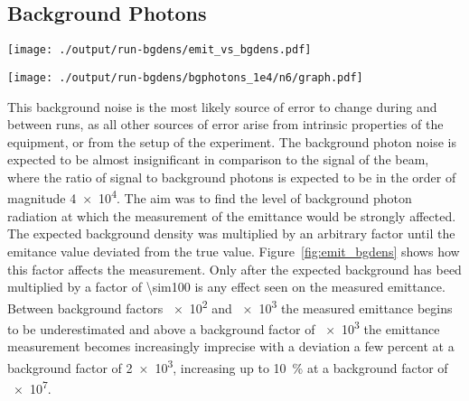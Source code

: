 

\subsection{Background Photons}

\begin{figure*}%
	\begin{minipage}[t]{\columnwidth}
		\centering
		\texttt{[image: ./output/run-bgdens/emit\_vs\_bgdens.pdf]}
		\caption{
			Plot of the measured beam emittance against a factor of the expected
			background density of \SI{3.415e4}{photons\per\meter\squared}
		}
		\label{fig:emit_bgdens}
	\end{minipage}\hfill
	\begin{minipage}[t]{\columnwidth}
		\centering
		\texttt{[image: ./output/run-bgdens/bgphotons\_1e4/n6/graph.pdf]}
		\caption{
			Beam reconstruction for a background \num{1e4} times the expected
			background photon density.
		}
		\label{fig:large_bg}
	\end{minipage}
\end{figure*}

This background noise is the most likely source of error to change during and
between runs, as all other sources of error arise from intrinsic properties of
the equipment, or from the setup of the experiment. The background photon noise
is expected to be almost insignificant in comparison to the signal of the beam,
where the ratio of signal to background photons is expected to be in the order
of magnitude \num{4e4}. The aim was to find the level of background photon
radiation at which the measurement of the emittance would be strongly affected.
The expected background density was multiplied by an arbitrary factor until the
emitance value deviated from the true value.  Figure~\ref{fig:emit_bgdens} shows
how this factor affects the measurement. Only after the expected background has
beed multiplied by a factor of \num{\sim100} is any effect seen on the measured
emittance. Between background factors \num{e2} and \num{e3} the measured
emittance begins to be underestimated and above a background factor of \num{e3}
the emittance measurement becomes increasingly imprecise with a deviation a few
percent at a background factor of \num{2e3}, increasing up to \SI{10}{\percent}
at a background factor of \num{e7}.

